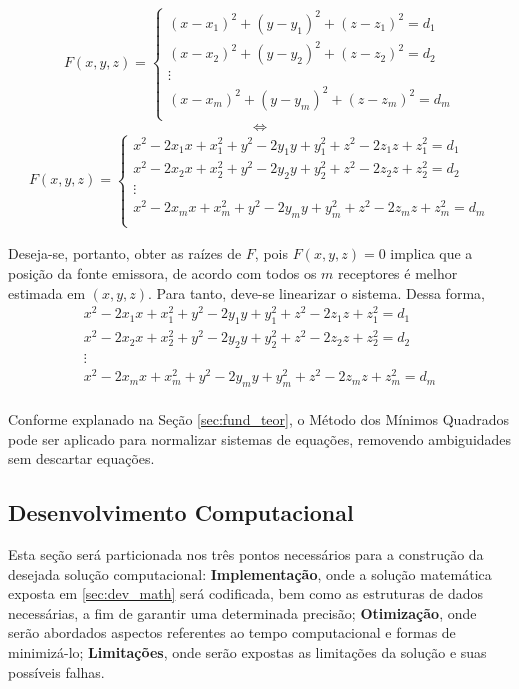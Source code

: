 	\begin{align*}
		F(x,y,z) =
		\left \{
		\begin{array}{cl}
			(x - x_1)^2 + (y - y_1)^2 + (z - z_1)^2 = d_1\\
			(x - x_2)^2 + (y - y_2)^2 + (z - z_2)^2 = d_2\\
			\vdots \\
			(x - x_m)^2 + (y - y_m)^2 + (z - z_m)^2 = d_m\\
		\end{array}
		\right.
	\end{align*}
	$$\iff$$
	\begin{align*}
		F(x,y,z) =
		\left \{
		\begin{array}{cl}
			x^2 - 2x_1x + x_1^2 + y^2 - 2y_1y + y_1^2 + z^2 - 2z_1z + z_1^2 = d_1\\
			x^2 - 2x_2x + x_2^2 + y^2 - 2y_2y + y_2^2 + z^2 - 2z_2z + z_2^2 = d_2\\
			\vdots \\
			x^2 - 2x_mx + x_m^2 + y^2 - 2y_my + y_m^2 + z^2 - 2z_mz + z_m^2 = d_m\\
		\end{array}
		\right.
	\end{align*}

	Deseja-se, portanto, obter as raízes de $F$, pois $F(x,y,z) = 0$ implica que a posição
	da fonte emissora, de acordo com todos os $m$ receptores é melhor estimada em $(x,y,z)$.
	Para tanto, deve-se linearizar o sistema. Dessa forma,
	\[
	\begin{array}{cl}
		x^2 - 2x_1x + x_1^2 + y^2 - 2y_1y + y_1^2 + z^2 - 2z_1z + z_1^2 = d_1\\
		x^2 - 2x_2x + x_2^2 + y^2 - 2y_2y + y_2^2 + z^2 - 2z_2z + z_2^2 = d_2\\
		\vdots \\
		x^2 - 2x_mx + x_m^2 + y^2 - 2y_my + y_m^2 + z^2 - 2z_mz + z_m^2 = d_m\\
	\end{array}
	\]

	Conforme explanado na Seção \ref{sec:fund_teor}, o Método dos Mínimos Quadrados pode ser aplicado
	para normalizar sistemas de equações, removendo ambiguidades sem descartar equações.

	\subsection{Desenvolvimento Computacional}
	\label{sec:dev_comp}
	Esta seção será particionada nos três pontos necessários para a construção da desejada solução
	computacional: \textbf{Implementação}, onde a solução matemática exposta em \ref{sec:dev_math}
	será codificada, bem como as estruturas de dados necessárias, a fim de garantir uma determinada
	precisão; \textbf{Otimização}, onde serão abordados aspectos referentes ao tempo computacional
	e formas de minimizá-lo; \textbf{Limitações}, onde serão expostas as limitações da solução e suas
	possíveis falhas.
